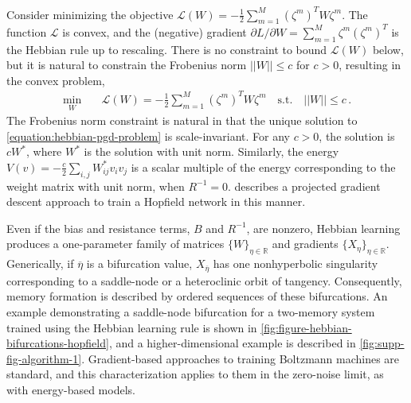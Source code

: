 \documentclass[12pt]{article}
\newcommand\colorAutoref[1]{{\hypersetup{linkcolor=blue}\autoref{#1}}}  %
\begin{document}
Consider minimizing the objective $\mathcal{L}(W) = - \frac{1}{2}\sum_{m=1}^{M} (\zeta^m)^T W \zeta^m$. The function $\mathcal{L}$ is convex, and the (negative) gradient $\partial L / \partial W = \sum_{m=1}^{M} \zeta^m(\zeta^m)^T$ is the Hebbian rule up to rescaling. There is no constraint to bound $\mathcal{L}(W)$ below, but it is natural to constrain the Frobenius norm $||W|| \leq c$ for $c>0$, resulting in the convex problem,
\begin{align}
\label{equation:hebbian-pgd-problem}
\min_W \quad & \mathcal{L}(W) = - \frac{1}{2}\sum_{m=1}^{M} (\zeta^m)^T W \zeta^m \hspace{1em}
\textrm{s.t.} \hspace{1em} ||W|| \leq c \,.
\end{align}
The Frobenius norm constraint is natural in that the unique solution to \eqref{equation:hebbian-pgd-problem} is scale-invariant. For any $c>0$, the solution is $cW^{*}$, where $W^{*}$ is the solution with unit norm. Similarly, the energy $V(v) = -\frac{c}{2} \sum_{i,j} W^*_{ij} v_i v_j$ is a scalar multiple of the energy corresponding to the weight matrix with unit norm, when $R^{-1}=0$.  describes a projected gradient descent approach to train a Hopfield network in this manner.

Even if the bias and resistance terms, $B$ and $R^{-1}$, are nonzero, Hebbian learning produces a one-parameter family of matrices $\{W\}_{\eta \in \mathbb{R}}$ and gradients $\{X_{\eta}\}_{\eta \in \mathbb{R}}$. Generically, if $\overline{\eta}$ is a bifurcation value, $X_{\overline{\eta}}$ has one nonhyperbolic singularity corresponding to a saddle-node or a heteroclinic orbit of tangency. Consequently, memory formation is described by ordered sequences of these bifurcations. An example demonstrating a saddle-node bifurcation for a two-memory system trained using the Hebbian learning rule is shown in \colorAutoref{fig:figure-hebbian-bifurcations-hopfield}, and a higher-dimensional example is described in \colorAutoref{fig:supp-fig-algorithm-1}. Gradient-based approaches to training Boltzmann machines are standard, and this characterization applies to them in the zero-noise limit, as with energy-based models.



\end{document}
